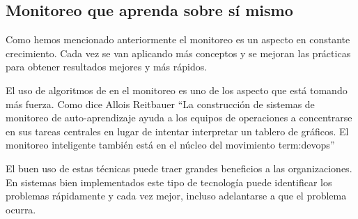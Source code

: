 \subsection{Monitoreo que aprenda sobre sí mismo}
\label{que-aprenda}

Como hemos mencionado anteriormente el monitoreo es un aspecto en constante
crecimiento. Cada vez se van aplicando más conceptos y se mejoran las prácticas
para obtener resultados mejores y más rápidos.

El uso de algoritmos de  en el monitoreo es uno de los
aspecto que está tomando más fuerza. Como dice Allois Reitbauer “La
construcción de sistemas de monitoreo de auto-aprendizaje ayuda a los equipos
de operaciones a concentrarse en sus tareas centrales en lugar de intentar
interpretar un tablero de gráficos. El monitoreo inteligente también está en el
núcleo del movimiento
\gls{term:devops}”\cite[Prefacio]{monitoreo:anomaly_detection_for_monitoring}

El buen uso de estas técnicas puede traer grandes beneficios a las
organizaciones. En sistemas bien implementados este tipo de tecnología puede
identificar los problemas rápidamente y cada vez mejor, incluso adelantarse a
que el problema ocurra.

